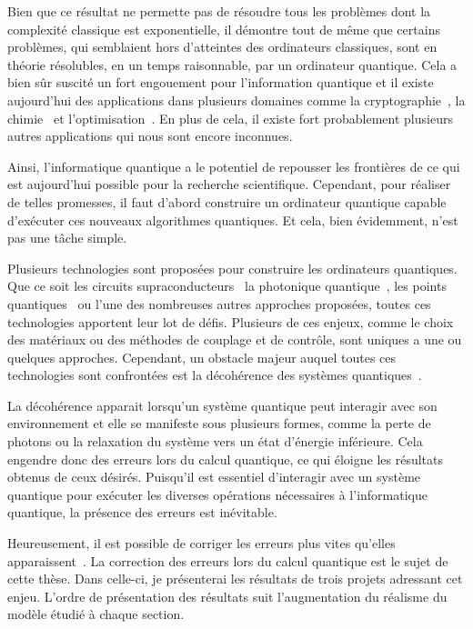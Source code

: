Bien que ce résultat ne permette pas de résoudre tous les problèmes dont la complexité classique
est exponentielle,
il démontre tout de même que certains problèmes,
qui semblaient hors d'atteintes des ordinateurs classiques,
sont en théorie résolubles, en un temps raisonnable, par un ordinateur quantique.
Cela a bien sûr suscité un fort engouement pour l'information quantique et
il existe aujourd'hui des applications dans plusieurs domaines comme
la cryptographie~\cite{bennett_quantum_2014, gisin_quantum_2002}, 
la chimie~\cite{lanyon_towards_2010, mcardle_quantum_2020, cao_quantum_2019} 
et l'optimisation~\cite{montanaro_quantum_2016, grover_quantum_1997}.
En plus de cela,
il existe fort probablement plusieurs autres applications qui nous sont encore inconnues.

Ainsi,
l'informatique quantique a le potentiel de repousser les frontières de ce qui est aujourd’hui
possible pour la recherche scientifique.
Cependant,
pour réaliser de telles promesses,
il faut d'abord construire un ordinateur quantique capable d'exécuter ces nouveaux algorithmes quantiques.
Et cela,
bien évidemment,
n'est pas une tâche simple.

Plusieurs technologies sont proposées pour construire les ordinateurs quantiques.
Que ce soit les circuits supraconducteurs~\cite{wallraf_strong_2004, krantz_quantum_2019}
la photonique quantique~\cite{obrien_photonic_2009, kok_linear_2007},
les points quantiques~\cite{pioro-ladriere_electrically_2008, loss_quantum_1998}
ou l'une des nombreuses autres approches proposées,
toutes ces technologies apportent leur lot de défis.
Plusieurs de ces enjeux,
comme le choix des matériaux ou
des méthodes de couplage et de contrôle,
sont uniques a une ou quelques approches.
Cependant,
un obstacle majeur auquel toutes ces technologies sont confrontées
est la décohérence des systèmes quantiques~\cite{unruh_maintaining_1995, palma_quantum_1996}.

La décohérence apparait lorsqu'un système quantique peut interagir avec son environnement
et elle se manifeste sous plusieurs formes, 
comme la perte de photons ou la relaxation du système vers un état d'énergie inférieure.
Cela engendre donc des erreurs lors du calcul quantique,
ce qui éloigne les résultats obtenus de ceux désirés.
Puisqu'il est essentiel d'interagir avec un système quantique pour exécuter les diverses 
opérations nécessaires à l'informatique quantique,
la présence des erreurs est inévitable.

Heureusement,
il est possible de corriger les erreurs plus vites qu'elles apparaissent~\cite{aharonov_fault-tolerant_1999}.
La correction des erreurs lors du calcul quantique est le sujet de cette thèse.
Dans celle-ci,
je présenterai les résultats de trois projets adressant cet enjeu.
L'ordre de présentation des résultats suit l'augmentation du réalisme du modèle étudié à chaque section.

